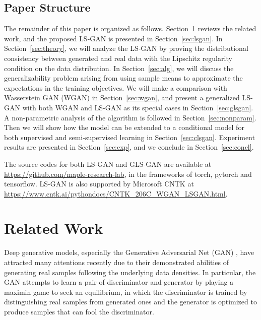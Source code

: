 \documentclass[11pt,fullpage, letterpaper,twoside]{article}
\newcommand{\1}[1]{\mathds{1}_{\left[#1\right]}}
\begin{document}
\vspace{-2mm}
\subsection{Paper Structure}
The remainder of this paper is organized as follows. Section~\ref{sec:related} reviews the related work, and the proposed LS-GAN is presented in Section~\ref{sec:lsgan}.  In Section~\ref{sec:theory}, we will analyze the LS-GAN by proving the distributional consistency between generated and real data with the Lipschitz regularity condition on the data distribution. In Section~\ref{sec:alg}, we will discuss the generalizability problem arising from using sample means to approximate the expectations in the training objectives. We will make a comparison with Wasserstein GAN (WGAN) in Section~\ref{sec:wgan}, and present a generalized LS-GAN with both WGAN and LS-GAN as its special cases in Section~\ref{sec:glsgan}. A non-parametric analysis of the algorithm is followed in Section~\ref{sec:nonparam}.
Then we will show how the model can be extended to a conditional model for both supervised and semi-supervised learning in Section~\ref{sec:clsgan}. Experiment results are presented in Section~\ref{sec:exp}, and we conclude in Section~\ref{sec:concl}.

 The source codes for both LS-GAN and GLS-GAN are available at \url{https://github.com/maple-research-lab}, in the frameworks of torch, pytorch and tensorflow. LS-GAN is also supported by Microsoft CNTK at \url{https://www.cntk.ai/pythondocs/CNTK_206C_WGAN_LSGAN.html}.







\section{Related Work}\label{sec:related}


Deep generative models, especially the Generative Adversarial Net (GAN) \cite{goodfellow2014generative}, have attracted many attentions recently due to their demonstrated abilities of generating real samples following the underlying data densities.  In particular, the GAN attempts to learn a pair of discriminator and generator by playing a maximin game to seek an equilibrium, in which the discriminator is trained by distinguishing real samples from generated ones and the generator is optimized to produce samples that can fool the discriminator.
\end{document}
